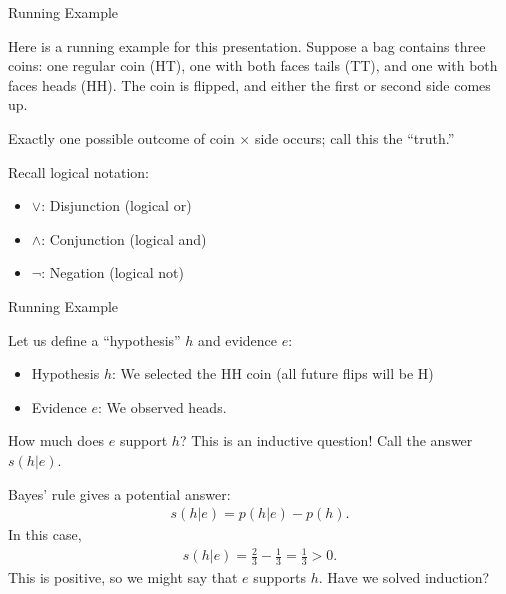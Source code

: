 \documentclass[8pt]{beamer}\usepackage[]{graphicx}\usepackage[]{color}
\begin{document}
\begin{frame}{Running Example}

    \setminipage{}

Here is a running example for this presentation. Suppose a bag contains three
coins: one regular coin (HT), one with both faces tails (TT), and one with both
faces heads (HH).  The coin is flipped, and either the first or second side
comes up.

Exactly one possible outcome
of coin $\times$ side occurs; call this the ``truth.''

\pause
%
Recall logical notation:
%
\begin{itemize}
%
\item $\lor$: Disjunction (logical or)
\item $\land$: Conjunction (logical and)
\item $\lnot$: Negation (logical not)
%
\end{itemize}
%


\end{frame}



\begin{frame}{Running Example}

\setminipage{}

Let us define a ``hypothesis'' $h$ and evidence $e$:
%
\begin{itemize}
%
\item Hypothesis $h$: We selected the HH coin (all future flips will be H)
\item Evidence $e$: We observed heads.
%
\end{itemize}
%
How much does $e$ support $h$?  This is an inductive question!  Call the answer
$s(h | e)$.

\pause
Bayes' rule gives a potential answer:
%
\begin{align*}
%
s(h | e) = p(h | e) - p(h).
%
\end{align*}
%
In this case,
%
\begin{align*}
%
s(h | e) = \frac{2}{3} - \frac{1}{3}  = \frac{1}{3} > 0.
%
\end{align*}
%
This is positive, so we might say that $e$ supports $h$.
Have we solved induction?
%
\end{frame}


\end{document}
